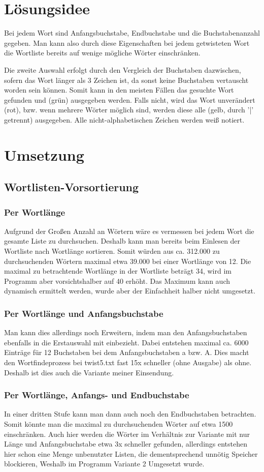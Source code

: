 \documentclass[a4paper,10pt,ngerman]{scrartcl}
\title{\Aufgabe}
\author{\Name\\Team-ID: \TeamId}
\date{\today}
\newcommand{\newsection}{\vspace{3\baselineskip}\section}
\newcommand{\newsubsection}{\vspace{2\baselineskip}\subsection}
\newcommand{\newsubsubsection}{\vspace{1\baselineskip}\subsubsection}
\begin{document}
\maketitle
\vspace{7\baselineskip}
\tableofcontents
\pagebreak



\newsection{Lösungsidee}
\vspace{1\baselineskip}
Bei jedem Wort sind Anfangsbuchstabe, Endbuchstabe und die Buchstabenanzahl gegeben. Man kann also durch diese Eigenschaften bei jedem getwisteten Wort die Wortliste bereits auf wenige mögliche Wörter einschränken.

Die zweite Auswahl erfolgt durch den Vergleich der Buchstaben dazwischen, sofern das Wort länger als 3 Zeichen ist, da sonst keine Buchstaben vertauscht worden sein können. Somit kann in den meisten Fällen das gesuchte Wort gefunden und (grün) ausgegeben werden. Falls nicht, wird das Wort unverändert (rot), bzw. wenn mehrere Wörter möglich sind, werden diese alle (gelb, durch '|' getrennt) ausgegeben. Alle nicht-alphabetischen Zeichen werden weiß notiert.


\pagebreak
\newsection{Umsetzung}

\newsubsection{Wortlisten-Vorsortierung}

\newsubsubsection{Per Wortlänge} %
Aufgrund der Großen Anzahl an Wörtern wäre es vermessen bei jedem Wort die gesamte Liste zu durchsuchen. Deshalb kann man bereits beim Einlesen der Wortliste nach Wortlänge sortieren. Somit würden aus ca. 312.000 zu durchsuchenden Wörtern maximal etwa 39.000 bei einer Wortlänge von 12.
Die maximal zu betrachtende Wortlänge in der Wortliste beträgt 34, wird im Programm aber vorsichtshalber auf 40 erhöht. Das Maximum kann auch dynamisch ermittelt werden, wurde aber der Einfachheit halber nicht umgesetzt.

\newsubsubsection{Per Wortlänge und Anfangsbuchstabe} %
Man kann dies allerdings noch Erweitern, indem man den Anfangsbuchstaben ebenfalls in die Erstauswahl mit einbezieht. Dabei entstehen maximal ca. 6000 Einträge für 12 Buchstaben bei dem Anfangsbuchstaben a bzw. A. Dies macht den Wortfindeprozess bei twist5.txt fast 15x schneller (ohne Ausgabe) als ohne. Deshalb ist dies auch die Variante meiner Einsendung.

\newsubsubsection{Per Wortlänge, Anfangs- und Endbuchstabe} %
In einer dritten Stufe kann man dann auch noch den Endbuchstaben betrachten. Somit könnte man die maximal zu durchsuchenden Wörter auf etwa 1500 einschränken. Auch hier werden die Wörter im Verhältnis zur Variante mit nur Länge und Anfangsbuchstabe etwa 3x schneller gefunden, allerdings entstehen hier schon eine Menge unbenutzter Listen, die dementsprechend unnötig Speicher blockieren, Weshalb im Programm Variante 2 Umgesetzt wurde.
\end{document}

